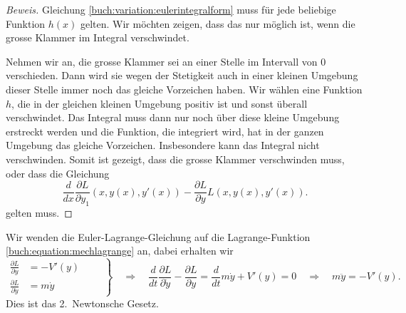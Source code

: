 \begin{proof}[Beweis]
Gleichung \eqref{buch:variation:eulerintegralform}
muss für jede beliebige Funktion $h(x)$ gelten.
Wir möchten zeigen, dass das nur möglich ist, wenn die grosse Klammer
im Integral verschwindet.

Nehmen wir an, die grosse Klammer sei an einer Stelle im Intervall 
von $0$ verschieden.
Dann wird sie wegen der Stetigkeit auch in einer kleinen Umgebung dieser
Stelle immer noch das gleiche Vorzeichen haben.
Wir wählen eine Funktion $h$, die in der gleichen kleinen Umgebung
positiv ist und sonst überall verschwindet.
Das Integral muss dann nur noch über diese kleine Umgebung erstreckt
werden und die Funktion, die integriert wird, hat in der ganzen Umgebung
das gleiche Vorzeichen.
Insbesondere kann das Integral nicht verschwinden.
Somit ist gezeigt, dass die grosse Klammer verschwinden muss, oder dass
die Gleichung
\begin{equation}
\frac{d}{dx} \frac{\partial L}{\partial y_1} (x,y(x),y'(x)) 
-
\frac{\partial L}{\partial y}L(x,y(x),y'(x)).
\end{equation}
gelten muss.
\end{proof}

\begin{beispiel}
Wir wenden die Euler-Lagrange-Gleichung auf die Lagrange-Funktion
\eqref{buch:equation:mechlagrange} an, dabei erhalten wir
\[
\left.
\begin{aligned}
\frac{\partial L}{\partial y}
&=
-V'(y)
\\
\frac{\partial L}{\partial\dot{y}}
&=
m\dot{y}
\end{aligned}
\qquad\right\}
\quad\Rightarrow\quad
\frac{d}{dt} \frac{\partial L}{\partial \dot{y}} - \frac{\partial L}{\partial y}
=
\frac{d}{dt} 
m\dot{y} +V'(y)=0
\quad\Rightarrow\quad
m\ddot{y} = -V'(y).
\]
Dies ist das 2.~Newtonsche Gesetz.
\end{beispiel}

